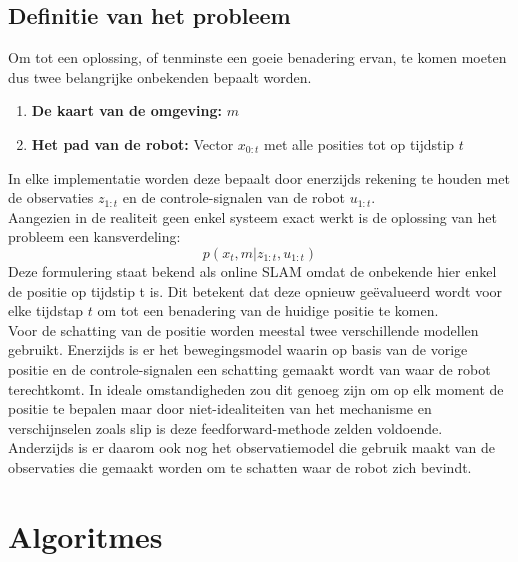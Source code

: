 \subsection{Definitie van het probleem}
Om tot een oplossing, of tenminste een goeie benadering ervan, te komen moeten dus twee belangrijke onbekenden bepaalt worden.
\begin{enumerate}
\item \textbf{De kaart van de omgeving: }$m$
\item \textbf{Het pad van de robot: }Vector $x_{0:t}$ met alle posities tot op tijdstip $t$
\end{enumerate}
In elke implementatie worden deze bepaalt door enerzijds rekening te houden met de observaties $z_{1:t}$ en de controle-signalen van de robot $u_{1:t}$.\\
Aangezien in de realiteit geen enkel systeem exact werkt is de oplossing van het probleem een kansverdeling:
\begin{equation*}
p( x_{t}  ,  m | z_{1:t}  ,  u_{1:t})
\end{equation*}
Deze formulering staat bekend als online SLAM omdat de onbekende hier enkel de positie op tijdstip t is. Dit betekent dat deze opnieuw geëvalueerd wordt voor elke tijdstap $t$ om tot een benadering van de huidige positie te komen.\\
Voor de schatting van de positie worden meestal twee verschillende modellen gebruikt. Enerzijds is er het bewegingsmodel waarin op basis van de vorige positie en de controle-signalen een schatting gemaakt wordt van waar de robot terechtkomt. In ideale omstandigheden zou dit genoeg zijn om op elk moment de positie te bepalen maar door niet-idealiteiten van het mechanisme en verschijnselen zoals slip is deze feedforward-methode zelden voldoende. Anderzijds is er daarom ook nog het observatiemodel die gebruik maakt van de observaties die gemaakt worden om te schatten waar de robot zich bevindt.
\section{Algoritmes}
